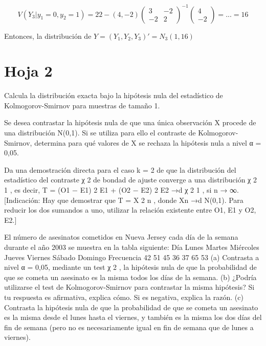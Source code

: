 \begin{problem}[7]
\[
V(Y_3|y_1=0,y_2=1) = 22 - (4,-2) \begin{pmatrix} 3&-2\\-2&2 \end{pmatrix}^{-1} \begin{pmatrix}4\\-2\end{pmatrix} = ... = 16
\]


Entonces, la distribución de $Y = (Y_1,Y_2,Y_3)' = N_3(1,16)$

\end{problem}

\section{Hoja 2}


\begin{problem}[1] Calcula la distribución exacta bajo la hipótesis nula del estadístico de Kolmogorov-Smirnov para
muestras de tamaño 1.

\solution

\end{problem}
\begin{problem}[2] Se desea contrastar la hipótesis nula de que una única observación X procede de una distribución
N(0,1). Si se utiliza para ello el contraste de Kolmogorov-Smirnov, determina para qué valores de
X se rechaza la hipótesis nula a nivel α = 0,05.
\solution

\end{problem}
\begin{problem}[3] Da una demostración directa para el caso k = 2 de que la distribución del estadístico del contraste
χ
2 de bondad de ajuste converge a una distribución χ
2
1
, es decir,
T =
(O1 − E1)
2
E1
+
(O2 − E2)
2
E2
→d χ
2
1
, si n → ∞.
[Indicación: Hay que demostrar que T = X
2
n
, donde Xn →d N(0,1). Para reducir los dos sumandos
a uno, utilizar la relación existente entre O1, E1 y O2, E2.]
\solution

\end{problem}
\begin{problem}[4] El número de asesinatos cometidos en Nueva Jersey cada día de la semana durante el año 2003
se muestra en la tabla siguiente:
Día Lunes Martes Miércoles Jueves Viernes Sábado Domingo
Frecuencia 42 51 45 36 37 65 53
(a) Contrasta a nivel α = 0,05, mediante un test χ
2
, la hipótesis nula de que la probabilidad de que
se cometa un asesinato es la misma todos los días de la semana.
(b) ¿Podría utilizarse el test de Kolmogorov-Smirnov para contrastar la misma hipótesis? Si tu
respuesta es afirmativa, explica cómo. Si es negativa, explica la razón.
(c) Contrasta la hipótesis nula de que la probabilidad de que se cometa un asesinato es la misma
desde el lunes hasta el viernes, y también es la misma los dos días del fin de semana (pero no es
necesariamente igual en fin de semana que de lunes a viernes).
\solution

\end{problem}
